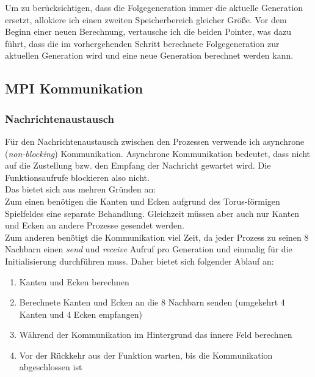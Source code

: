 \documentclass[german,plainarticle,hyperref,utf8]{zihpub}
\begin{document}
	Um zu berücksichtigen, dass die Folgegeneration immer die aktuelle Generation ersetzt, allokiere ich einen zweiten Speicherbereich gleicher Größe. Vor dem Beginn einer neuen Berechnung, vertausche ich die beiden Pointer, was dazu führt, dass die im vorhergehenden Schritt berechnete Folgegeneration zur aktuellen Generation wird und eine neue Generation berechnet werden kann.
	
	\subsection{MPI Kommunikation}
	\subsubsection{Nachrichtenaustausch} \label{message}
	Für den Nachrichtenaustausch zwischen den Prozessen verwende ich asynchrone (\textit{non-blocking}) Kommunikation. Asynchrone Kommunikation bedeutet, dass nicht auf die Zustellung bzw. den Empfang der Nachricht gewartet wird. Die Funktionsaufrufe blockieren also nicht.\\
	Das bietet sich aus mehren Gründen an:\\
	Zum einen benötigen die Kanten und Ecken aufgrund des Torus-förmigen Spielfeldes eine separate Behandlung. Gleichzeit müssen aber auch nur Kanten und Ecken an andere Prozesse gesendet werden.\\
	Zum anderen benötigt die Kommunikation viel Zeit, da jeder Prozess zu seinen 8 Nachbarn einen \textit{send} und \textit{receive} Aufruf pro Generation und einmalig für die Initialisierung durchführen muss.
	Daher bietet sich folgender Ablauf an:
	\begin{enumerate}
		\item Kanten und Ecken berechnen
		\item Berechnete Kanten und Ecken an die 8 Nachbarn senden (umgekehrt 4 Kanten und 4 Ecken empfangen)
		\item Während der Kommunikation im Hintergrund das innere Feld berechnen
		\item Vor der Rückkehr aus der Funktion warten, bis die Kommunikation abgeschlossen ist
	\end{enumerate}
	
\end{document}
